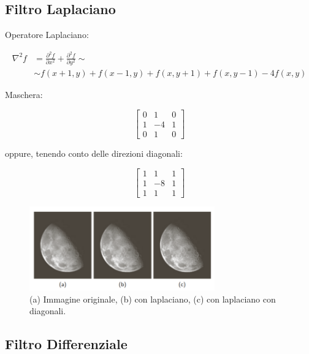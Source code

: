 \subsection{Filtro Laplaciano}

Operatore Laplaciano:

\begin{align*}
    \nabla^2 f & = \frac{\partial^2{f}}{\partial{x^2}} + \frac{\partial^2{f}}{\partial{y^2}} \sim \\
               & \sim f(x+1,y)+f(x-1,y)+f(x,y+1)+f(x,y-1)-4f(x,y)
\end{align*}

Maschera:

\begin{center}
    \[
        \begin{bmatrix}
            0 & 1  & 0 \\
            1 & -4 & 1 \\
            0 & 1  & 0
        \end{bmatrix}
    \]
\end{center}

oppure, tenendo conto delle direzioni diagonali:

\begin{center}
    \[
        \begin{bmatrix}
            1 & 1  & 1 \\
            1 & -8 & 1 \\
            1 & 1  & 1
        \end{bmatrix}
    \]
\end{center}

\begin{figure}[H]
    \centering
    \includegraphics[width=8cm, keepaspectratio]{capitoli/immagini/imgs/laplaciano.png}
    \caption{(a) Immagine originale, (b) con laplaciano, (c) con laplaciano con
        diagonali.}
\end{figure}

\subsection{Filtro Differenziale}

